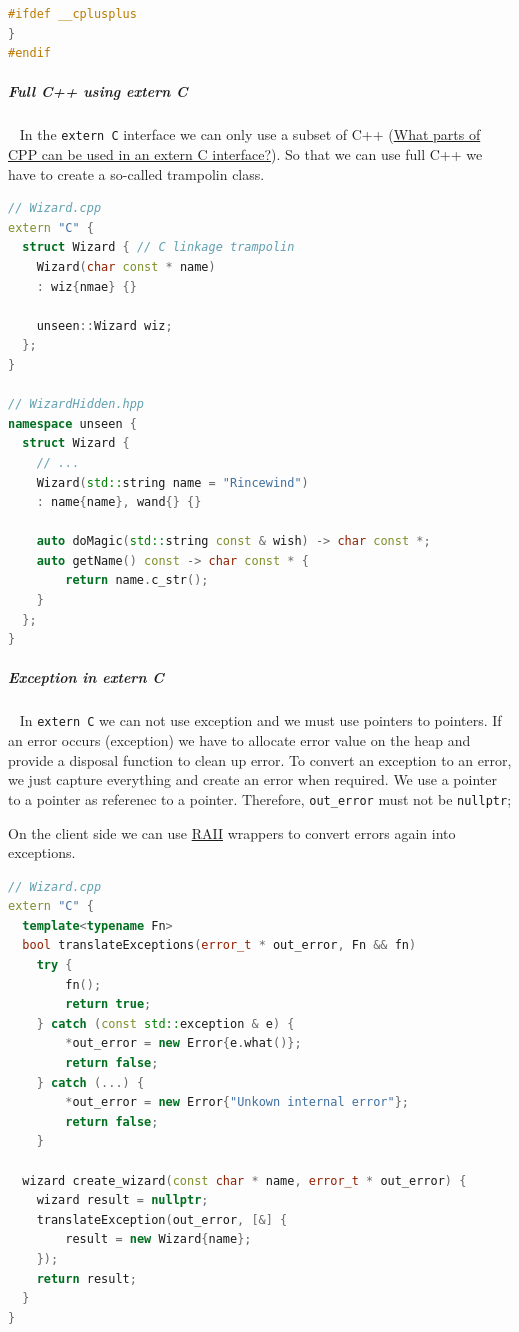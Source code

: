 \documentclass[11pt,twoside,landscape]{article}
\begin{document}
\begin{multicols}{2}
\begin{lstlisting}[language=c++,label=lst:orgd76726d,caption={Example for a extern C interface},captionpos=b,numbers=none]
#ifdef __cplusplus
}
#endif
\end{lstlisting}

\subparagraph{Full C++ using extern C} \
\label{sec:org1647190}
In the \texttt{extern C} interface we can only use a subset of C++ (\href{../../../roam/20230706185259-what_parts_of_cpp_can_be_used_in_an_extern_c_interface.org}{What parts of CPP can be used in an extern C interface?}).
So that we can use full C++ we have to create a so-called trampolin class.

\begin{lstlisting}[language=c++,label=lst:org7e8f524,caption={Example for a trampolin class},captionpos=b,numbers=none]
// Wizard.cpp
extern "C" {
  struct Wizard { // C linkage trampolin
    Wizard(char const * name)
    : wiz{nmae} {}

    unseen::Wizard wiz;
  };
}

// WizardHidden.hpp
namespace unseen {
  struct Wizard {
    // ...
    Wizard(std::string name = "Rincewind")
    : name{name}, wand{} {}

    auto doMagic(std::string const & wish) -> char const *;
    auto getName() const -> char const * {
        return name.c_str();
    }
  };
}
\end{lstlisting}

\subparagraph{Exception in extern C} \
\label{sec:org20b203a}
In \texttt{extern C} we can not use exception and we must use pointers to pointers.
If an error occurs (exception) we have to allocate error value on the heap and provide a disposal function to clean up error.
To convert an exception to an error, we just capture everything and create an error when required.
We use a pointer to a pointer as referenec to a pointer.
Therefore, \texttt{out\_error} must not be \texttt{nullptr};

On the client side we can use \href{../../../roam/20220118172628-resource_acquisition_is_initialization.org}{RAII} wrappers to convert errors again into exceptions.


\begin{lstlisting}[language=c++,numbers=none]
// Wizard.cpp
extern "C" {
  template<typename Fn>
  bool translateExceptions(error_t * out_error, Fn && fn)
    try {
        fn();
        return true;
    } catch (const std::exception & e) {
        *out_error = new Error{e.what()};
        return false;
    } catch (...) {
        *out_error = new Error{"Unkown internal error"};
        return false;
    }

  wizard create_wizard(const char * name, error_t * out_error) {
    wizard result = nullptr;
    translateException(out_error, [&] {
        result = new Wizard{name};
    });
    return result;
  }
}
\end{lstlisting}


\end{multicols}
\end{document}
